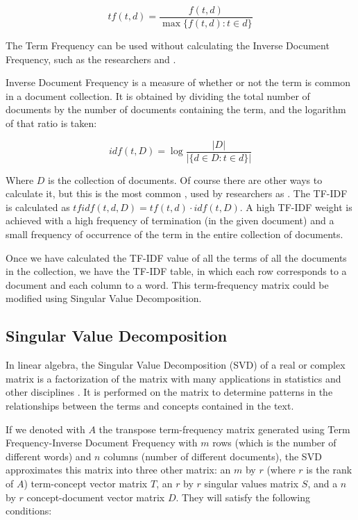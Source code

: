 $$
tf(t,d)=\frac{f(t,d)}{\max\{ f(t,d):t\in d\}}
$$

The Term Frequency can be used without calculating the Inverse Document Frequency, such as the researchers \cite{cohen1996learning} and \cite{segal1999mailcat}.

Inverse Document Frequency is a measure of whether or not the term is common in a document collection. It is obtained by dividing the total number of documents by the number of documents containing the term, and the logarithm of that ratio is taken:

$$
idf(t,D)=\log\frac{\lvert D\rvert}{\lvert\{ d\in D:t\in d\}\rvert}
$$

Where $D$ is the collection of documents. Of course there are other ways to calculate it, but this is the most common \citep{tang2014email}, used by researchers as \cite{drucker1999support}. The TF-IDF is calculated as $tfidf(t,d,D) = tf(t,d)\cdot idf(t,D)$. A high TF-IDF weight is achieved with a high frequency of termination (in the given document) and a small frequency of occurrence of the term in the entire collection of documents.

Once we have calculated the TF-IDF value of all the terms of all the documents in the collection, we have the TF-IDF table, in which each row corresponds to a document and each column to a word. This term-frequency matrix could be modified using Singular Value Decomposition.

\subsection{Singular Value Decomposition}\label{ssect:svd}

In linear algebra, the Singular Value Decomposition (SVD) of a real or complex matrix is a factorization of the matrix with many applications in statistics and other disciplines \citep{stewart1993early}. It is performed on the matrix to determine patterns in the relationships between the terms and concepts contained in the text.

If we denoted with $A$ the transpose term-frequency matrix generated using Term Frequency-Inverse Document Frequency with $m$ rows (which is the number of different words) and $n$ columns (number of different documents), the SVD approximates this matrix into three other matrix: an $m$ by $r$ (where $r$ is the rank of $A$) term-concept vector matrix $T$, an $r$ by $r$ singular values matrix $S$, and a $n$ by $r$ concept-document vector matrix $D$. They will satisfy the following conditions:

